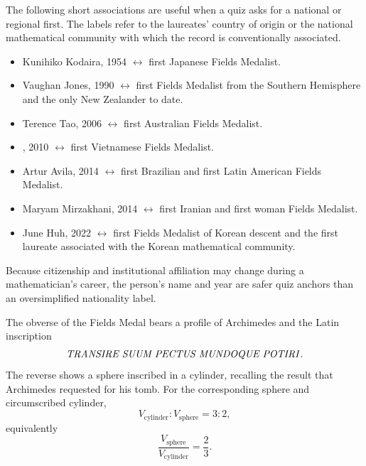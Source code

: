     \begin{fact}
        The following short associations are useful when a quiz asks for a
        national or regional first. The labels refer to the laureates' country
        of origin or the national mathematical community with which the record
        is conventionally associated.
        \begin{itemize}
            \item Kunihiko Kodaira, 1954 $\leftrightarrow$ first Japanese Fields
                  Medalist.
            \item Vaughan Jones, 1990 $\leftrightarrow$ first Fields Medalist from
                  the Southern Hemisphere and the only New Zealander to date.
            \item Terence Tao, 2006 $\leftrightarrow$ first Australian Fields
                  Medalist.
            \item \NgoBaoChau, 2010 $\leftrightarrow$ first Vietnamese Fields
                  Medalist.
            \item Artur Avila, 2014 $\leftrightarrow$ first Brazilian and first
                  Latin American Fields Medalist.
            \item Maryam Mirzakhani, 2014 $\leftrightarrow$ first Iranian and
                  first woman Fields Medalist.
            \item June Huh, 2022 $\leftrightarrow$ first Fields Medalist of Korean
                  descent and the first laureate associated with the Korean
                  mathematical community.
        \end{itemize}
        Because citizenship and institutional affiliation may change during a
        mathematician's career, the person's name and year are safer quiz anchors
        than an oversimplified nationality label.
    \end{fact}

    \begin{fact}
        The obverse of the Fields Medal bears a profile of Archimedes and the
        Latin inscription
        \[
            \text{\textit{TRANSIRE SUUM PECTUS MUNDOQUE POTIRI}}.
        \]
        The reverse shows a sphere inscribed in a cylinder, recalling the result
        that Archimedes requested for his tomb. For the corresponding sphere
        and circumscribed cylinder,
        \[
            V_{\mathrm{cylinder}}:V_{\mathrm{sphere}}=3:2,
        \]
        equivalently
        \[
            \frac{V_{\mathrm{sphere}}}{V_{\mathrm{cylinder}}}=\frac23.
        \]
    \end{fact}

